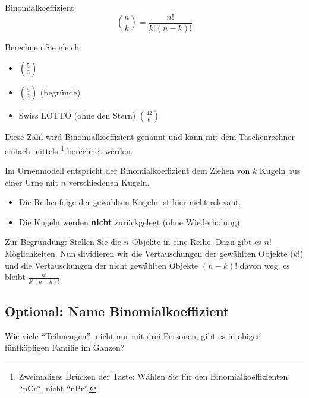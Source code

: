 \begin{definition}{Binomialkoeffizient}{}
$${n\choose k} = \frac{n!}{k!(n-k)!}$$
\end{definition}

Berechnen Sie gleich:
\begin{itemize}
\item $5\choose 3$
\item $5\choose 2$ (begründe) 
\item Swiss LOTTO (ohne den Stern) ${42\choose 6}$ 
\end{itemize}


Diese Zahl wird Binomialkoeffizient genannt und kann mit dem
Taschenrechner einfach
mittels \footnote{Zweimaliges Drücken der Taste:
Wählen Sie für den Binomialkoeffizienten ``nCr'', nicht ``nPr''.}
berechnet werden.



\begin{gesetz}{}{}
Im Urnenmodell entspricht der Binomialkoeffizient dem Ziehen von $k$ Kugeln aus einer
Urne mit $n$ verschiedenen Kugeln.
\begin{itemize}
\item
  Die Reihenfolge der gewählten
  Kugeln ist hier nicht relevant.
\item Die Kugeln werden \textbf{nicht} zurückgelegt (ohne
  Wiederholung).
\end{itemize}
\end{gesetz}


\begin{bemerkung}{}{}
Zur Begründung: Stellen Sie die $n$ Objekte in eine Reihe. Dazu gibt
es $n!$ Möglichkeiten. Nun dividieren wir die Vertauschungen der
gewählten Objekte ($k!$) und die Vertauschungen der nicht gewählten
Objekte $(n-k)!$ davon weg, es bleibt $\frac{n!}{k!(n-k)!}$.
\end{bemerkung}
\newpage

\subsection{Optional: Name Binomialkoeffizient}


 Wie viele ``Teilmengen'', nicht nur mit drei Personen, gibt es in obiger
  fünfköpfigen Familie im Ganzen?


